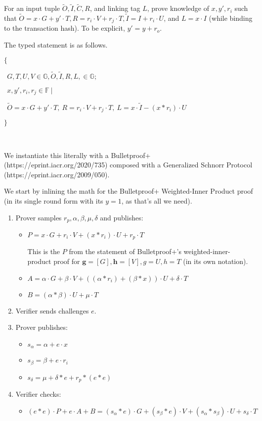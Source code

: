 \documentclass[]{article}
\begin{document}
For an input tuple $\tilde{O}, \tilde{I}, \tilde{C}, R$, and linking tag $L$, prove knowledge of $x, y', r_i$ such that $\tilde{O} = x \cdot G + y' \cdot T, R = r_i \cdot V + r_j \cdot T, \tilde{I} = I + r_i \cdot U$, and $L = x \cdot I$ (while binding to the transaction hash). To be explicit, $y' = y + r_o$.

The typed statement is as follows.

$\{$

$~~G, T, U, V \in \mathbb{G}, \tilde{O}, \tilde{I}, R, L, \in \mathbb{G};$

$~~x, y', r_i, r_j \in \mathbb{F} ~|$

$~~\tilde{O} = x \cdot G + y' \cdot T,~ R = r_i \cdot V + r_j \cdot T,~ L = x \cdot \tilde{I} - (x * r_i) \cdot U$

$\}$

\

We instantiate this literally with a Bulletproof+ (https://eprint.iacr.org/2020/735) composed with a Generalized Schnorr Protocol (https://eprint.iacr.org/2009/050).

We start by inlining the math for the Bulletproof+ Weighted-Inner Product proof (in its single round form with its $y = 1$, as that's all we need).

\begin{enumerate}
	\item
	Prover samples $r_p, \alpha, \beta, \mu, \delta$ and publishes:
	\begin{itemize}
		\item
		$P = x \cdot G + r_i \cdot V + (x * r_i) \cdot U + r_p \cdot T$
		
		This is the $P$ from the statement of Bulletproof+'s weighted-inner-product proof for $\boldsymbol{g} = [G], \boldsymbol{h} = [V], g = U, h = T$ (in its own notation).
		\item
		$A = \alpha \cdot G + \beta \cdot V + ((\alpha * r_i) + (\beta * x)) \cdot U + \delta \cdot T$
		\item
		$B = (\alpha * \beta) \cdot U + \mu \cdot T$
	\end{itemize}
	\item
	Verifier sends challenges $e$.
	\item
	Prover publishes:
	\begin{itemize}
		\item
		$s_\alpha = \alpha + e \cdot x$	
		\item
		$s_\beta = \beta + e \cdot r_i$
		\item
		$s_\delta = \mu + \delta * e + r_p * (e * e)$
	\end{itemize}
	\item
	Verifier checks:
	\begin{itemize}
		\item
		$(e * e) \cdot P + e \cdot A + B = (s_\alpha * e) \cdot G + (s_\beta * e) \cdot V + (s_\alpha * s_\beta) \cdot U + s_\delta \cdot T$
	\end{itemize}
\end{enumerate}
\end{document}
